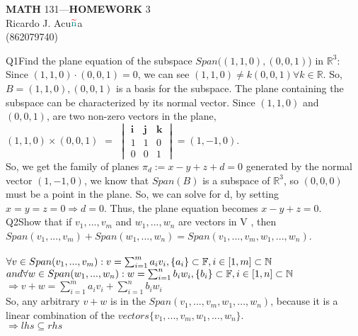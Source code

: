 \documentclass{article}
\begin{document}
\begin{center}
  \textbf{MATH} 131---\textbf{HOMEWORK} 3\\
  \color{red}R\color{teal}icardo
  \color{red}J\color{cyan}.
  \color{red}A\color{teal}cu$\color{red}{\widetilde{\color{teal}\text{n}}}$\color{teal}a\color{black}\\
  \color{teal}(\color{red}862079740\color{teal})\color{black}\\
\end{center}

Q1\quad Find the plane equation of the subspace
$Span((1, 1, 0), (0, 0, 1)$) in $\mathbb{R}^3$:\\

Since $(1,1,0)\cdot(0,0,1)=0$, we can see $(1,1,0) \neq k(0,0,1)
\forall k \in \mathbb{R}$. So, $B = {(1,1,0),(0,0,1)}$ is a basis for
the subspace. The plane containing the subspace can be characterized
by its normal vector. Since $(1,1,0)$ and $(0,0,1)$, are two non-zero vectors
in the plane,\\
$ (1,1,0) \times (0,0,1)$
$ =$
$\begin{vmatrix}
  \textbf{i} & \textbf{j} & \textbf{k}\\
  1&1&0\\
  0&0&1
\end{vmatrix}
$$=(1,-1,0)$.\\
So, we get the family of planes $\pi_d := x -y +z +d = 0$
generated by the normal vector $(1,-1,0)$, we know that $Span(B)$ is a
subspace of $\mathbb{R}^3$, so $(0,0,0)$ must be a point in the
plane. So, we can solve for d, by setting $x = y = z = 0 \Rightarrow d
= 0$. Thus, the plane equation becomes $ x -y +z = 0$.\\

Q2\quad Show that if $v_1 , . . . , v_m$ and $w_1 , . . . , w_n$ are vectors in V , then
$Span(v_1 , . . . , v_m ) + Span(w_1 , . . . , w_n ) = Span(v_1 ,
. . . , v_m , w_1 , . . . , w_n)$.\\

\\
$\forall v \in Span(v_1 , . . . , v_m ): v  = \sum_{i=1}^{m} a_iv_i,
\{a_i\} \subset \mathbb{F}, i \in [1,m] \subset \mathbb{N} \\
$
$and\\
\forall w \in Span(w_1 , . . . , w_n ): w = \sum_{i=1}^{n} b_iw_i,
\{b_i\} \subset \mathbb{F}, i \in [1,n] \subset \mathbb{N} \\$
$\Rightarrow v + w = \sum_{i=1}^{m} a_iv_i +\sum_{i=1}^{n} b_iw_i$\\
So, any arbitrary $v+w$ is in the $Span(v_1 ,
. . . , v_m , w_1 , . . . , w_n)$, because it is a linear combination
of the $vectors \{v_1 ,. . . , v_m , w_1 , . . . , w_n\}$.\\
$\Rightarrow lhs \subseteq rhs$\\
\end{document}
